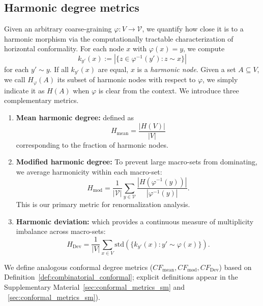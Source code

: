 \documentclass[twocolumn,superscriptaddress,tightenlines,aps,prx,floatfix]{revtex4-2}
\begin{document}
\begin{bibunit}
\section{Harmonic degree metrics}
\label{section:harmonic_degree}

Given an arbitrary coarse-graining $\varphi: V \rightarrow \mathcal{V}$, we quantify how close it is to a harmonic morphism via the computationally tractable characterization of horizontal conformality. 
For each node $x$ with $\varphi(x)=y$, we compute
\begin{equation}
k_{y'}(x) := |\{ z \in \varphi^{-1}(y') : z \sim x \}|
\label{eq:multiplicity}
\end{equation}
for each $y' \sim y$. If all $k_{y'}(x)$ are equal, $x$ is a \emph{harmonic node}. Given a set $A \subseteq V$, we call $H_{\varphi}(A)$ its subset of harmonic nodes with respect to $\varphi$, we simply indicate it as $H(A)$ when $\varphi$ is clear from the context. 
We introduce three complementary metrics.
\begin{enumerate}
\item  \textbf{Mean harmonic degree:} defined as 
\begin{equation}
H_{\text{mean}} = \frac{|H(V)|}{|V|}
\end{equation}
corresponding to the fraction of harmonic nodes.

\item \textbf{Modified harmonic degree:} To prevent large macro-sets from dominating, we average harmonicity within each macro-set:
\begin{equation}
H_{\text{mod}} = \frac{1}{|\mathcal{V}|}\sum_{y \in \mathcal{V}} \frac{|H(\varphi^{-1}(y))|}{|\varphi^{-1}(y)|}.
\end{equation}
This is our primary metric for renormalization analysis.

\item \textbf{Harmonic deviation:} which provides a continuous measure of multiplicity imbalance across macro-sets:
\begin{equation}
H_{\text{Dev}} = \frac{1}{|V|}\sum_{x \in V} \mathrm{std}\!\left(\{k_{y'}(x) : y' \sim \varphi(x)\}\right).
\end{equation}
\end{enumerate}

We define analogous conformal degree metrics ($CF_{\text{mean}}, CF_{\text{mod}}, CF_{\text{Dev}}$) based on Definition~\ref{def:combinatorial_conformal}; explicit definitions appear in the Supplementary Material~\ref{sec:conformal_metrics_sm} and ~\ref{sec:conformal_metrics_sm}). 


\end{bibunit}
\end{document}
